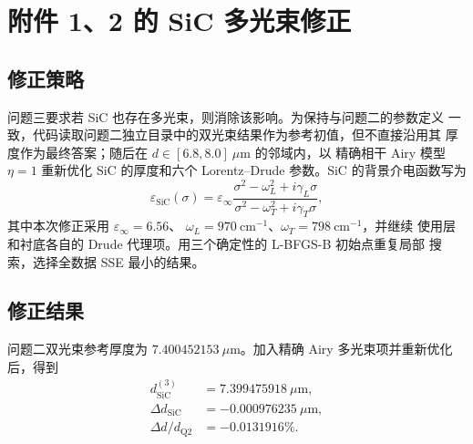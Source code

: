 \documentclass[UTF8,12pt,a4paper]{ctexart}
\begin{document}
\section{附件 1、2 的 SiC 多光束修正}

\subsection{修正策略}

问题三要求若 SiC 也存在多光束，则消除该影响。为保持与问题二的参数定义
一致，代码读取问题二独立目录中的双光束结果作为参考初值，但不直接沿用其
厚度作为最终答案；随后在 $d\in[6.8,8.0]\ \mu\mathrm{m}$ 的邻域内，以
精确相干 Airy 模型 $\eta=1$ 重新优化 SiC 的厚度和六个 Lorentz--Drude
参数。SiC 的背景介电函数写为
\begin{equation}
  \varepsilon_{\mathrm{SiC}}(\sigma)=\varepsilon_\infty
  \frac{\sigma^2-\omega_L^2+i\gamma_L\sigma}
       {\sigma^2-\omega_T^2+i\gamma_T\sigma},
  \label{eq:sic-dielectric}
\end{equation}
其中本次修正采用 $\varepsilon_\infty=6.56$、
$\omega_L=970\ \mathrm{cm}^{-1}$、$\omega_T=798\ \mathrm{cm}^{-1}$，并继续
使用层和衬底各自的 Drude 代理项。用三个确定性的 L-BFGS-B 初始点重复局部
搜索，选择全数据 SSE 最小的结果。

\subsection{修正结果}

问题二双光束参考厚度为
$7.400452153\ \mu\mathrm{m}$。加入精确 Airy 多光束项并重新优化后，得到
\[
\begin{aligned}
  d_{\mathrm{SiC}}^{(3)}&=7.399475918\ \mu\mathrm{m},\\
  \Delta d_{\mathrm{SiC}}&=-0.000976235\ \mu\mathrm{m},\\
  \Delta d/d_{\mathrm{Q2}}&=-0.0131916\%.
\end{aligned}
\]

\begin{table}[H]
  \centering
  \caption{SiC 双光束结果与精确 Airy 修正结果}
  \label{tab:sic-correction}
  \small
  \setlength{\tabcolsep}{3pt}
\end{table}
\end{document}

